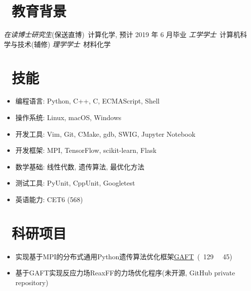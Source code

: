 \documentclass{resume}
\begin{document}


 
\section{\faGraduationCap\  教育背景}
\textit{在读博士研究生}(保送直博)\ 计算化学, 预计 2019 年 6 月毕业
\textit{工学学士}\ 计算机科学与技术(辅修)
\textit{理学学士}\ 材料化学

\section{\faCogs\ 技能}
\begin{itemize}[parsep=0.5ex]
  \item 编程语言: Python, C++, C, ECMAScript, Shell
  \item 操作系统: Linux, macOS, Windows
  \item 开发工具: Vim, Git, CMake, gdb, SWIG, Jupyter Notebook
  \item 开发框架: MPI, TensorFlow, scikit-learn, Flask
  \item 数学基础: 线性代数, 遗传算法, 最优化方法
  \item 测试工具: PyUnit, CppUnit, Googletest
  \item 英语能力: CET6 (568)
\end{itemize}

\section{\faUsers\ 科研项目}

\begin{onehalfspacing}
\begin{itemize}
    \item 实现基于MPI的分布式通用Python遗传算法优化框架\faLink \href{https://github.com/PytLab/gaft}{GAFT}\ (\faStar\ 129 \ \faCodeFork\ 45)
  \item 基于GAFT实现反应力场ReaxFF的力场优化程序(未开源, GitHub private repository)
\end{itemize}
\end{onehalfspacing}
\end{document}
